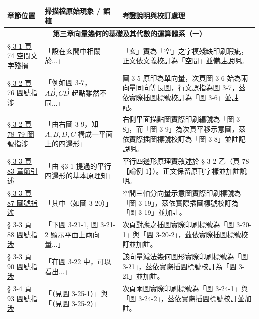 \documentclass[a4paper,12pt,twoside]{article}
\begin{document}
\begin{table}[H]
\centering
\small
\renewcommand{\arraystretch}{1.35}
\begin{tabularx}{\textwidth}{|p{3.0cm}|p{3.8cm}|X|}
\hline
\textbf{章節位置} & \textbf{掃描檔原始現象 / 誤植} & \textbf{考證說明與校訂處理} \\ \hline

\multicolumn{3}{|c|}{\textbf{第三章\quad 向量幾何的基礎及其代數的運算體系（一）}} \\ \hline

\hyperref[note:b3-ch3-p74-space-font]{§ 3-1 頁 74 空間文字殘損} & 
「設在玄間中相關於...」 & 
「玄」實為「空」之字模殘缺印刷瑕疵，正文依文義校訂為「空間」並備註說明。 \\ \hline

\hyperref[note:b3-ch3-p76-fig-ref]{§ 3-2 頁 76 圖號指涉} & 
「例如圖 3-7，$\vec{AB},\vec{CD}$ 起點雖然不同...」 & 
圖 3-5 原印為單向量，次頁圖 3-6 始為兩向量同向等長圖，行文誤指為圖 3-7，茲依實際插圖標號校訂為「圖 3-6」並註記。 \\ \hline

\hyperref[note:b3-ch3-p78-fig3-9]{§ 3-2 頁 78--79 圖號指涉} & 
「由右圖 3-9，知 $A,B,D,C$ 構成一平面上的四邊形」 & 
右側平面描點圖實際印刷編號為「圖 3-8」，而「圖 3-9」為次頁平移示意圖，茲依實際插圖標號校訂為「圖 3-8」並註記說明。 \\ \hline

\hyperref[note:b3-ch3-p83-sec-ref]{§ 3-3 頁 83 章節引述} & 
「由 §3-1 提過的平行四邊形的基本原理知」 & 
平行四邊形原理實敘述於 § 3-2 乙（頁 78【論例 1】）。正文保留原刊字樣並加註說明。 \\ \hline

\hyperref[note:b3-ch3-p87-fig-ref]{§ 3-3 頁 87 圖號指涉} & 
「其中（如圖 3-20）」 & 
空間三軸分向量示意圖實際印刷標號為「圖 3-19」，茲依實際插圖標號校訂為「圖 3-19」並加註。 \\ \hline

\hyperref[note:b3-ch3-p88-fig-ref]{§ 3-3 頁 88 圖號指涉} & 
「下圖 3-21-1, 圖 3-21-2 顯示平面上兩向量...」 & 
次頁對應之插圖實際印刷標號為「圖 3-20-1」與「圖 3-20-2」，茲依實際插圖標號校訂並加註。 \\ \hline

\hyperref[note:b3-ch3-p90-fig-ref]{§ 3-3 頁 90 圖號指涉} & 
「在圖 3-22 中，可以看出...」 & 
該向量減法幾何圖形實際印刷標號為「圖 3-21」，茲依實際插圖標號校訂為「圖 3-21」並加註。 \\ \hline

\hyperref[note:b3-ch3-p93-fig-ref]{§ 3-4 頁 93 圖號指涉} & 
「（見圖 3-25-1）」與「（見圖 3-25-2）」 & 
次頁兩圖實際印刷標號為「圖 3-24-1」與「圖 3-24-2」，茲依實際插圖標號校訂並加註。 \\ \hline


\end{tabularx}
\end{table}
\end{document}
